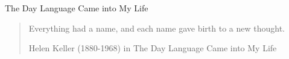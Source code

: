 




\begin{frame}{The Day Language Came into My Life}



  \blockquote[Helen Keller (1880-1968) in The Day Language Came into My Life]{
    Everything had a name, and each name gave birth to a new thought.
  }





% 






\end{frame}










